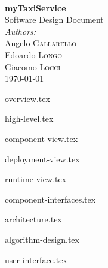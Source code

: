 \documentclass[12pt, a4paper]{article}
\begin{document}
\begin{titlepage}
 


\HRule \\[0.4cm]
{ \huge \bfseries myTaxiService} \\[0.2cm]%
	{\Large Software Design Document}
\HRule \\[1.5cm]
 


\large \emph{Authors:}\\
Angelo  \textsc{Gallarello}\\
Edoardo  \textsc{Longo}\\
Giacomo  \textsc{Locci}\\[1.5cm]


{\large \today} %



\vfill %

\end{titlepage}

\newpage

\tableofcontents

\newpage

{overview.tex}

{high-level.tex}

{component-view.tex}

{deployment-view.tex}

{runtime-view.tex}

{component-interfaces.tex}

{architecture.tex}

{algorithm-design.tex}

{user-interface.tex}
\end{document}
